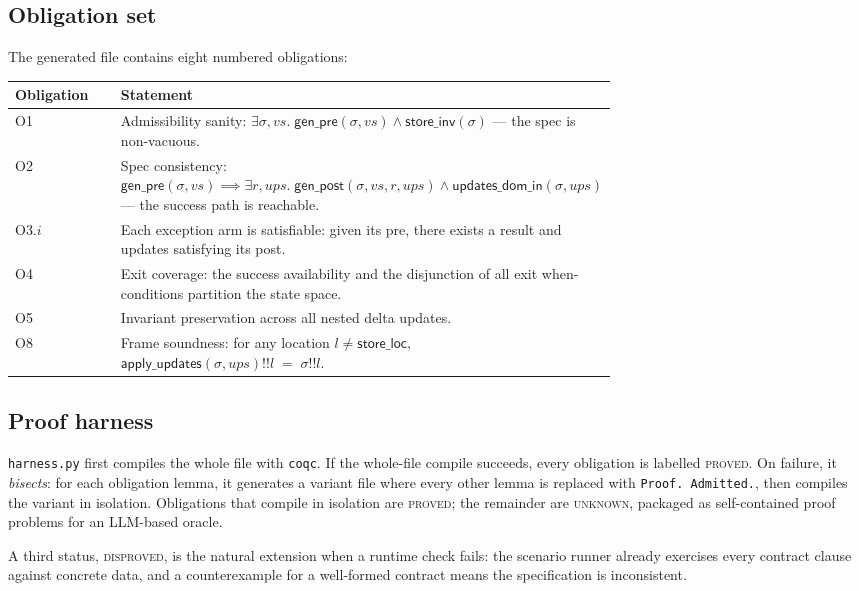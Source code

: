 \documentclass[11pt,a4paper]{article}
\begin{document}
\subsection{Obligation set}

The generated file contains eight numbered obligations:

\begin{tabular}{@{}lp{0.7\linewidth}@{}}
\toprule
\textbf{Obligation} & \textbf{Statement} \\
\midrule
O1 & Admissibility sanity: $\exists \sigma, vs.\;
     \mathsf{gen\_pre}(\sigma, vs) \land \mathsf{store\_inv}(\sigma)$
     --- the spec is non-vacuous. \\
O2 & Spec consistency: $\mathsf{gen\_pre}(\sigma, vs) \implies
     \exists r, \mathit{ups}.\; \mathsf{gen\_post}(\sigma, vs, r, \mathit{ups})
     \land \mathsf{updates\_dom\_in}(\sigma, \mathit{ups})$
     --- the success path is reachable. \\
O3.$i$ & Each exception arm is satisfiable: given its pre, there
          exists a result and updates satisfying its post. \\
O4 & Exit coverage: the success availability and the disjunction of
     all exit when-conditions partition the state space. \\
O5 & Invariant preservation across all nested delta updates. \\
O8 & Frame soundness: for any location $l \neq \mathsf{store\_loc}$,
     $\mathsf{apply\_updates}(\sigma, \mathit{ups}) !! l \;=\; \sigma !! l$. \\
\bottomrule
\end{tabular}

\subsection{Proof harness}

\texttt{harness.py} first compiles the whole file with
\texttt{coqc}.  If the whole-file compile succeeds, every obligation
is labelled \textsc{proved}.  On failure, it \emph{bisects}: for each
obligation lemma, it generates a variant file where every other lemma
is replaced with \texttt{Proof. Admitted.}, then compiles the variant
in isolation.  Obligations that compile in isolation are
\textsc{proved}; the remainder are \textsc{unknown}, packaged as
self-contained proof problems for an LLM-based oracle.

A third status, \textsc{disproved}, is the natural extension when a
runtime check fails: the scenario runner already exercises every
contract clause against concrete data, and a counterexample for a
well-formed contract means the specification is inconsistent.
\end{document}
